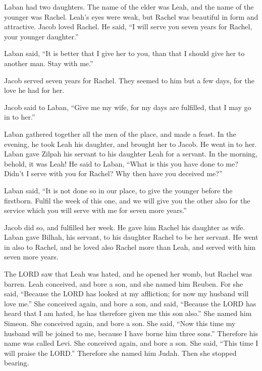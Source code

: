  Laban had two daughters. The name of the elder was Leah,
and the name of the younger was Rachel.  Leah's eyes were
weak, but Rachel was beautiful in form and attractive. 
Jacob loved Rachel. He said, ``I will serve you seven years for Rachel,
your younger daughter.''

 Laban said, ``It is better that I give her to you, than
that I should give her to another man. Stay with me.''

 Jacob served seven years for Rachel. They seemed to him
but a few days, for the love he had for her.

 Jacob said to Laban, ``Give me my wife, for my days are
fulfilled, that I may go in to her.''

 Laban gathered together all the men of the place, and
made a feast.  In the evening, he took Leah his daughter,
and brought her to Jacob. He went in to her.  Laban gave
Zilpah his servant to his daughter Leah for a servant. 
In the morning, behold, it was Leah! He said to Laban, ``What is this
you have done to me? Didn't I serve with you for Rachel? Why then have
you deceived me?''

 Laban said, ``It is not done so in our place, to give
the younger before the firstborn.  Fulfil the week of
this one, and we will give you the other also for the service which you
will serve with me for seven more years.''

 Jacob did so, and fulfilled her week. He gave him Rachel
his daughter as wife.  Laban gave Bilhah, his servant, to
his daughter Rachel to be her servant.  He went in also
to Rachel, and he loved also Rachel more than Leah, and served with him
seven more years.

 The LORD saw that Leah was hated, and he opened her
womb, but Rachel was barren.  Leah conceived, and bore a
son, and she named him Reuben. For she said, ``Because the LORD has
looked at my affliction; for now my husband will love me.''
 She conceived again, and bore a son, and said, ``Because
the LORD has heard that I am hated, he has therefore given me this son
also.'' She named him Simeon.  She conceived again, and
bore a son. She said, ``Now this time my husband will be joined to me,
because I have borne him three sons.'' Therefore his name was called
Levi.  She conceived again, and bore a son. She said,
``This time I will praise the LORD.'' Therefore she named him Judah.
Then she stopped bearing.

